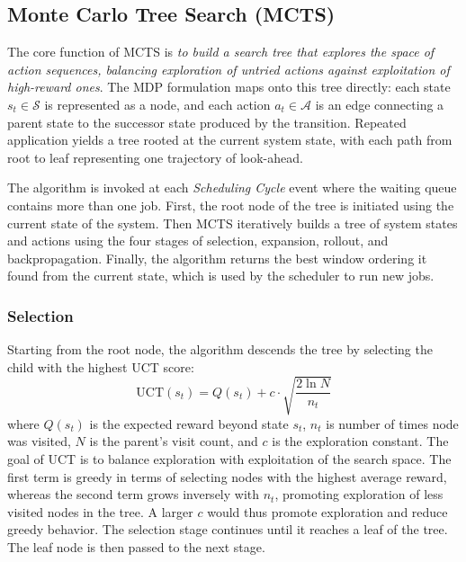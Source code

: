 \documentclass[conference]{IEEEtran}
\begin{document}
\subsection{Monte Carlo Tree Search (MCTS)}
\label{sec:mcts}



The core function of MCTS is \emph{to build a search tree that explores the space of action sequences, balancing exploration of untried actions against exploitation of high-reward ones}. The MDP formulation maps onto this tree directly: each state $s_t \in \mathcal{S}$ is represented as a node, and each action $a_t \in \mathcal{A}$ is an edge connecting a parent state to the successor state produced by the transition. Repeated application yields a tree rooted at the current system state, with each path from root to leaf representing one trajectory of look-ahead.


The algorithm is invoked at each \emph{Scheduling Cycle} event where the waiting queue contains more than one job. First, the root node of the tree is initiated using the current state of the system. Then MCTS iteratively builds a tree of system states and actions using the four stages of selection, expansion, rollout, and backpropagation. Finally, the algorithm returns the best window ordering it found from the current state, which is used by the scheduler to run new jobs. 

\subsubsection{Selection}
\label{sec:selection}
Starting from the root node, the algorithm descends the tree by selecting the child with the highest UCT score:
\begin{equation}
    \text{UCT}(s_t) = Q(s_t) + c \cdot \sqrt{\frac{2 \ln N}{n_t}}
\end{equation}
where $Q(s_t)$ is the expected reward beyond state $s_t$, $n_t$ is number of times node was visited, $N$ is the parent's visit count, and $c$ is the exploration constant. The goal of UCT is to balance exploration with exploitation of the search space. The first term is greedy in terms of selecting nodes with the highest average reward, whereas the second term grows inversely with $n_t$, promoting exploration of less visited nodes in the tree. A larger $c$ would thus promote exploration and reduce greedy behavior. The selection stage continues until it reaches a leaf of the tree. The leaf node is then passed to the next stage.
\end{document}
